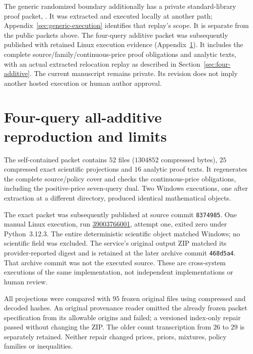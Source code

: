 \documentclass[pdflatex,sn-mathphys-num]{sn-jnl}
\theoremstyle{thmstyleone}
\theoremstyle{thmstylethree}
\theoremstyle{thmstyletwo}
\begin{document}
The generic randomized boundary additionally has a private standard-library proof packet, . It was extracted and executed locally at another path; Appendix~\ref{sec:generic-execution} identifies that replay's scope. It is separate from the public packets above. The four-query additive packet  was subsequently published with retained Linux execution evidence (Appendix~\ref{app:four-additive-replay}). It includes the complete source/family/continuous-price proof obligations and analytic texts, with an actual extracted relocation replay as described in Section~\ref{sec:four-additive}. The current manuscript remains private. Its revision does not imply another hosted execution or human author approval.

\section{Four-query all-additive reproduction and limits}
\label{app:four-additive-replay}
The self-contained packet  contains $52$
files ($1304852$ compressed bytes), $25$ compressed exact scientific
projections and $16$ analytic proof texts. It regenerates the complete
source/policy cover and checks the continuous-price obligations, including
the positive-price seven-query dual. Two Windows executions, one after
extraction at a different directory, produced identical mathematical objects.

The exact packet was subsequently published at source commit
\texttt{8374985}. One manual Linux execution, run
\href{https://github.com/SHiJiE1115/newproj/actions/runs/39003766001}{39003766001},
attempt one, exited zero under Python~3.12.3. The entire deterministic
scientific object matched Windows; no scientific field was excluded.
The service's original output ZIP matched its provider-reported digest
and is retained at the later archive commit \texttt{468d5a4}. That archive
commit was not the executed source. These are cross-system executions
of the same implementation, not independent implementations or human review.

All projections were compared with $95$ frozen original files using
compressed and decoded hashes. An original provenance reader omitted
the already frozen packet specification from its allowable origins and
failed; a versioned index-only repair passed without changing the ZIP.
The older count transcription from $26$ to $29$ is separately retained.
Neither repair changed prices, priors, mixtures, policy families or inequalities.
\end{document}
